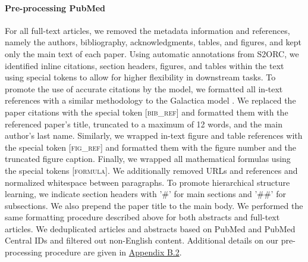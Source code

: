 \documentclass{article}
\begin{document}
\paragraph{Pre-processing PubMed} 
\label{ssec:preprocess}
For all full-text articles, we removed the metadata information and references, namely the authors, bibliography, acknowledgments, tables, and figures, and kept only the main text of each paper. 
Using automatic annotations from S2ORC, we identified inline citations, section headers, figures, and tables within the text using special tokens to allow for higher flexibility in downstream tasks. 
To promote the use of accurate citations by the model, we formatted all in-text references with a similar methodology to the Galactica model \citep{taylor2022galactica}.
We replaced the paper citations with the special token \textsc{[bib\_ref]} and formatted them with the referenced paper's title, truncated to a maximum of 12 words, and the main author's last name. 
Similarly, we wrapped in-text figure and table references with the special token \textsc{[fig\_ref]} and formatted them with the figure number and the truncated figure caption.
Finally, we wrapped all mathematical formulas using the special tokens \textsc{[formula]}. We additionally removed URLs and references and normalized whitespace between paragraphs. 
To promote hierarchical structure learning, we indicate section headers with '\#' for main sections and '\#\#' for subsections. We also prepend the paper title to the main body. 
We performed the same formatting procedure described above for both abstracts and full-text articles. 
We deduplicated articles and abstracts based on PubMed and PubMed Central IDs and filtered out non-English content. Additional details on our pre-processing procedure are given in \hyperref[sec:appendix-pubmed]{Appendix B.2}. 
\end{document}

